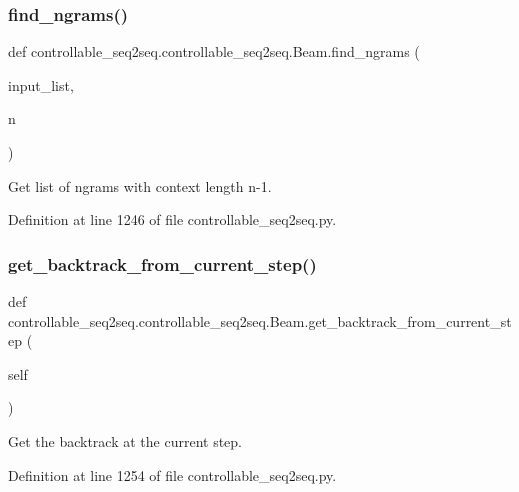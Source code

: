 \subsubsection{\texorpdfstring{find\+\_\+ngrams()}{find\_ngrams()}}
{\footnotesize\ttfamily def controllable\+\_\+seq2seq.\+controllable\+\_\+seq2seq.\+Beam.\+find\+\_\+ngrams (\begin{DoxyParamCaption}\item[{}]{input\+\_\+list,  }\item[{}]{n }\end{DoxyParamCaption})\hspace{0.3cm}{\ttfamily [static]}}

\begin{DoxyVerb}Get list of ngrams with context length n-1.\end{DoxyVerb}
 

Definition at line 1246 of file controllable\+\_\+seq2seq.\+py.

\mbox{\label{classcontrollable__seq2seq_1_1controllable__seq2seq_1_1Beam_ab391098d78edb7a48245bef1873b0df0}} 
\subsubsection{\texorpdfstring{get\+\_\+backtrack\+\_\+from\+\_\+current\+\_\+step()}{get\_backtrack\_from\_current\_step()}}
{\footnotesize\ttfamily def controllable\+\_\+seq2seq.\+controllable\+\_\+seq2seq.\+Beam.\+get\+\_\+backtrack\+\_\+from\+\_\+current\+\_\+step (\begin{DoxyParamCaption}\item[{}]{self }\end{DoxyParamCaption})}

\begin{DoxyVerb}Get the backtrack at the current step.\end{DoxyVerb}
 

Definition at line 1254 of file controllable\+\_\+seq2seq.\+py.



